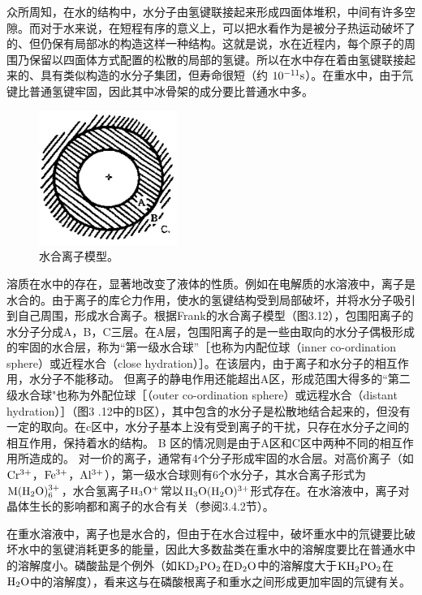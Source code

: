 众所周知，在水的结构中，水分子由氢键联接起来形成四面体堆积，中间有许多空隙。而对于水来说，在短程有序的意义上，可以把水看作为是被分子热运动破坏了的、但仍保有局部冰的构造这样一种结构。这就是说，水在近程内，每个原子的周围乃保留以四面体方式配置的松散的局部的氢键。所以在水中存在着由氢键联接起来的、具有类似构造的水分子集团，但寿命很短（约 $\rm 10^{-11}s$）。在重水中，由于氘键比普通氢键牢固，因此其中冰骨架的成分要比普通水中多。

\begin{figure}[htb]
 \centering
 \includegraphics[width=0.4\textwidth]{fig/cp03/img3.12.jpg}
 \caption{水合离子模型。}
\end{figure}

溶质在水中的存在，显著地改变了液体的性质。例如在电解质的水溶液中，离子是水合的。由于离子的库仑力作用，使水的氢键结构受到局部破坏，并将水分子吸引到自己周围，形成水合离子。根据Frank的水合离子模型（图3.12），包围阳离子的水分子分成A，B，C三层。在A层，包围阳离子的是一些由取向的水分子偶极形成的牢固的水合层，称为“第一级水合球”［也称为内配位球（inner co-ordination sphere）或近程水合（close hydration）］。在该层内，由于离子和水分子的相互作用，水分子不能移动。 但离子的静电作用还能超出A区，形成范围大得多的“第二级水合球"也称为外配位球［（outer co-ordination sphere）或远程水合（distant hydration）］（图3 .12中的B区），其中包含的水分子是松散地结合起来的，但没有一定的取向。在c区中，水分子基本上没有受到离子的干扰，只存在水分子之间的相互作用，保持着水的结构。 B 区的情况则是由于A区和C区中两种不同的相互作用所造成的。 对一价的离子，通常有4个分子形成牢固的水合层。对高价离子（如$\rm Cr^{3+}$，$\rm Fe^{3+}$，$\rm Al^{3+}$），第一级水合球则有6个水分子，其水合离子形式为$\rm M(H_2O)_6^{3+}$，水合氢离子$\rm H_3O^+$常以$\rm H_3O(H_2O)^{3+}$形式存在。在水溶液中，离子对晶体生长的影响都和离子的水合有关（参阅3.4.2节）。

在重水溶液中，离子也是水合的，但由于在水合过程中，破坏重水中的氘键要比破坏水中的氢键消耗更多的能量，因此大多数盐类在重水中的溶解度要比在普通水中的溶解度小。磷酸盐是个例外（如$\rm KD_2PO_2$在$\rm D_2O$中的溶解度大于$\rm KH_2PO_2$在$\rm H_2O$中的溶解度），看来这与在磷酸根离子和重水之间形成更加牢固的氘键有关。

